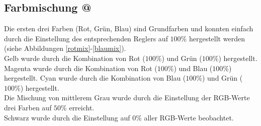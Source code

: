\documentclass[11pt]{article}
\makeatletter
\newcommand*{\rom}[1]{\expandafter\@slowromancap\romannumeral #1@}
\makeatother
\begin{document}
\subsection{Farbmischung \rom{1}}
Die ersten drei Farben (Rot, Grün, Blau) sind Grundfarben und konnten einfach durch die Einstellung des entsprechenden Reglers auf $100\%$ hergestellt werden (siehe Abbildungen \ref{rotmix}-\ref{blaumix}).  \\
Gelb wurde durch die Kombination von Rot ($100\%$) und Grün ($100\%$) hergestellt. 
Magenta wurde durch die Kombination von Rot ($100\%$) und Blau ($100\%$) hergestellt. 
Cyan wurde durch die Kombination von Blau ($100\%$) und Grün ($100\%$) hergestellt.  \\
Die Mischung von mittlerem Grau wurde durch die Einstellung der RGB-Werte drei Farben auf $50\%$ erreicht. \\
Schwarz wurde durch die Einstellung auf $0\%$ aller RGB-Werte beobachtet. \\
\end{document}
